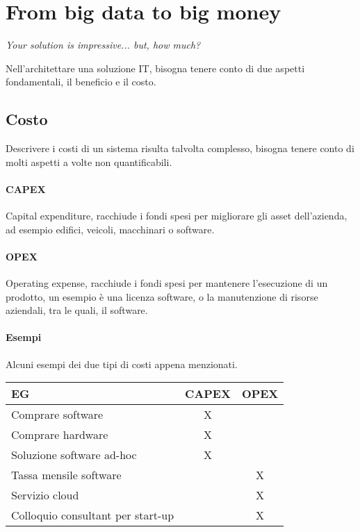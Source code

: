 \section{From big data to big money}
\begin{center}
    \emph{Your solution is impressive... but, how much?}
\end{center}
Nell'architettare una soluzione IT, bisogna tenere conto di due 
aspetti fondamentali, il beneficio e il costo.

\subsection{Costo}
Descrivere i costi di un sistema risulta talvolta complesso, 
bisogna tenere conto di molti aspetti a volte non quantificabili.

\paragraph{CAPEX}
Capital expenditure, racchiude i fondi spesi per migliorare gli asset dell'azienda, 
ad esempio edifici, veicoli, macchinari o software.

\paragraph{OPEX}
Operating expense, racchiude i fondi spesi per mantenere l'esecuzione di un prodotto, 
un esempio è una licenza software, o la manutenzione di risorse aziendali, tra 
le quali, il software.

\paragraph{Esempi}
Alcuni esempi dei due tipi di costi appena menzionati.
\begin{center}
    \begin{tabular}{lcc} 
    \toprule
        EG & CAPEX & OPEX \\
    \midrule
        Comprare software & X &  \\ 
        Comprare hardware & X &  \\
        Soluzione software ad-hoc  & X &  \\
        Tassa mensile software &   & X \\
        Servizio cloud &   & X \\
        Colloquio consultant per start-up &   & X \\
    \bottomrule
   \end{tabular}
\end{center}

